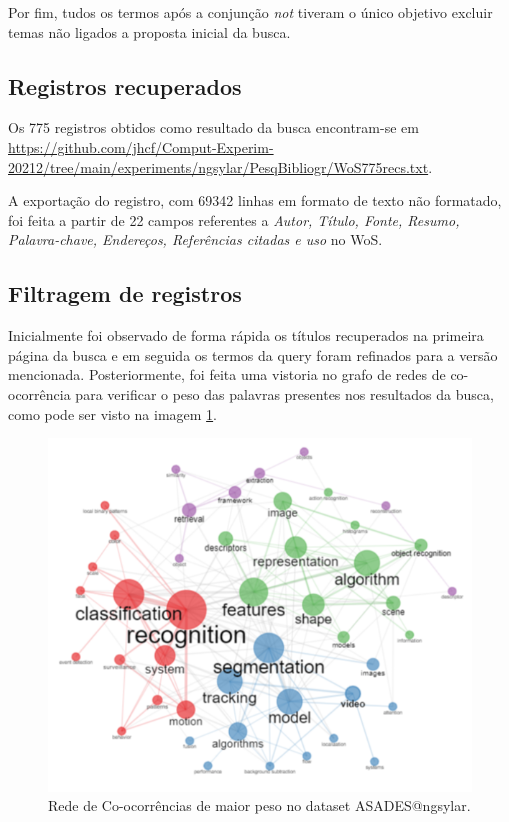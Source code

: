 Por fim, tudos os termos após a conjunção \textit{not} tiveram o único objetivo excluir temas não ligados a proposta inicial da busca.

\subsection{Registros recuperados}
Os 775 registros obtidos como resultado da busca encontram-se em \url{https://github.com/jhcf/Comput-Experim-20212/tree/main/experiments/ngsylar/PesqBibliogr/WoS775recs.txt}.

A exportação do registro, com 69342 linhas em formato de texto não formatado, foi feita a partir de 22 campos referentes a \textit{Autor, Título, Fonte, Resumo, Palavra-chave, Endereços, Referências citadas e uso} no WoS.

\subsection{Filtragem de registros}
Inicialmente foi observado de forma rápida os títulos recuperados na primeira página da busca e em seguida os termos da query foram refinados para a versão mencionada.
Posteriormente, foi feita uma vistoria no grafo de redes de co-ocorrência para verificar o peso das palavras presentes nos resultados da busca, como pode ser visto na imagem \ref{fig:evol:anual:cotonet:ASADES@ngsylar}.

\begin{figure}[H]
    \centering
    \includegraphics[width=1\textwidth]{experiments/ngsylar/PesqBibliogr/Imagens/ASADES-CoOccurrenceNetwork.png}
    \caption{Rede de Co-ocorrências de maior peso no dataset ASADES@ngsylar.}
    \label{fig:evol:anual:cotonet:ASADES@ngsylar}
\end{figure}

